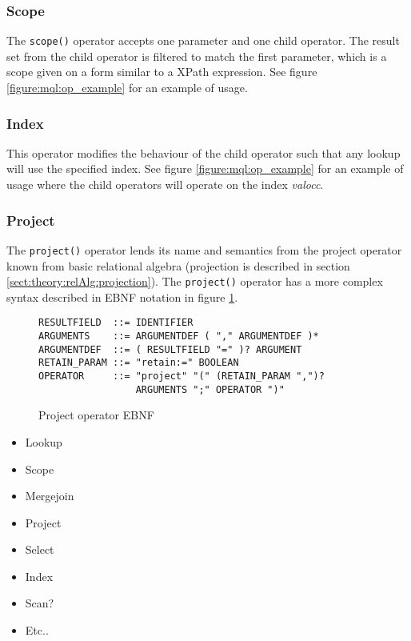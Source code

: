 \subsubsection{Scope}
\label{sect:method:marsOperators:scope}
The \texttt{scope()} operator accepts one parameter and one child operator. The
result set from the child operator is filtered to match the first parameter, which is a
scope given on a form similar to a XPath expression. See figure
\ref{figure:mql:op_example} for an example of usage. 

\subsubsection{Index}
\label{sect:method:marsOperators:index}
This operator modifies the behaviour of the child operator such that any lookup
will use the specified index. See figure \ref{figure:mql:op_example} for an
example of usage where the child operators will operate on the index
\textit{valocc}.

\subsubsection{Project}
\label{sect:method:marsOperators:project}
The \texttt{project()} operator lends its name and semantics from the project
operator known from basic relational algebra (projection is described in
section \ref{sect:theory:relAlg:projection}). The \texttt{project()} operator
has a more complex syntax described in EBNF notation in figure
\ref{figure:mql:ebnf:project_ebnf}.

\begin{figure}[!h]
\centering
\begin{Verbatim}
RESULTFIELD  ::= IDENTIFIER
ARGUMENTS    ::= ARGUMENTDEF ( "," ARGUMENTDEF )*
ARGUMENTDEF  ::= ( RESULTFIELD "=" )? ARGUMENT
RETAIN_PARAM ::= "retain:=" BOOLEAN
OPERATOR     ::= "project" "(" (RETAIN_PARAM ",")? 
                 ARGUMENTS ";" OPERATOR ")"
\end{Verbatim}
\caption{Project operator EBNF}
\label{figure:mql:ebnf:project_ebnf}
\end{figure}





\begin{itemize}
  \item Lookup
  \item Scope
  \item Mergejoin
  \item Project
  \item Select
  \item Index
  \item Scan?
  \item Etc..
\end{itemize}

